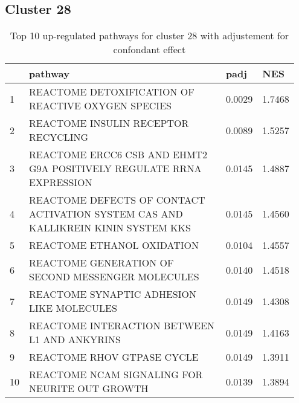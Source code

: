 \documentclass{article}
\begin{document}
\subsection{Cluster 28 }
\begin{table}[H]
\centering
\begin{tabular}{p{0.05\linewidth}p{0.7\linewidth}p{0.1\linewidth}p{0.1\linewidth}}
  \hline
 & pathway & padj & NES \\ 
  \hline
1 & REACTOME DETOXIFICATION OF REACTIVE OXYGEN SPECIES & 0.0029 & 1.7468 \\ 
  2 & REACTOME INSULIN RECEPTOR RECYCLING & 0.0089 & 1.5257 \\ 
  3 & REACTOME ERCC6 CSB AND EHMT2 G9A POSITIVELY REGULATE RRNA EXPRESSION & 0.0145 & 1.4887 \\ 
  4 & REACTOME DEFECTS OF CONTACT ACTIVATION SYSTEM CAS AND KALLIKREIN KININ SYSTEM KKS & 0.0145 & 1.4560 \\ 
  5 & REACTOME ETHANOL OXIDATION & 0.0104 & 1.4557 \\ 
  6 & REACTOME GENERATION OF SECOND MESSENGER MOLECULES & 0.0140 & 1.4518 \\ 
  7 & REACTOME SYNAPTIC ADHESION LIKE MOLECULES & 0.0149 & 1.4308 \\ 
  8 & REACTOME INTERACTION BETWEEN L1 AND ANKYRINS & 0.0149 & 1.4163 \\ 
  9 & REACTOME RHOV GTPASE CYCLE & 0.0149 & 1.3911 \\ 
  10 & REACTOME NCAM SIGNALING FOR NEURITE OUT GROWTH & 0.0139 & 1.3894 \\ 
   \hline
\end{tabular}
\caption{Top 10 up-regulated pathways for cluster 28 with adjustement for confondant effect} 
\label{tab:q3_2_conf_28}
\end{table}
\end{document}
